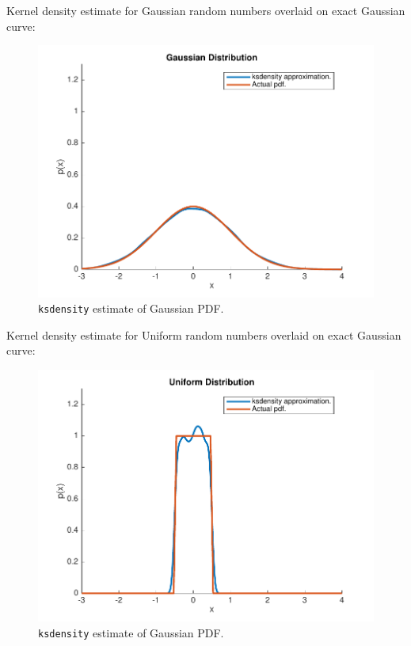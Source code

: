 \documentclass[12pt]{article}
\newcommand{\code}[1]{\texttt{#1}}
\begin{document}
\begin{enumerate}
Kernel density estimate for Gaussian random numbers overlaid on exact Gaussian curve:


\begin{figure}[H]
\includegraphics[width=\textwidth]{figures/gaussian-ksdensity.pdf}
  \caption{\code{ksdensity} estimate of Gaussian PDF.}
\end{figure}



Kernel density estimate for Uniform random numbers overlaid on exact Gaussian curve:


\begin{figure}[H]
\includegraphics[width=\textwidth]{figures/uniform-ksdensity.pdf}
  \caption{\code{ksdensity} estimate of Gaussian PDF.}
\end{figure}


\end{enumerate}
\end{document}
